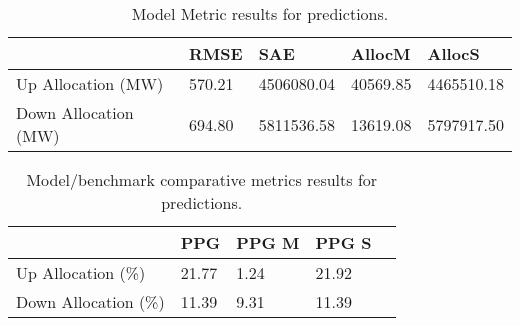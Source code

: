 \begin{table}[H] 
    \caption{Model Metric results for predictions. \label{pred_res_linear}}
    \begin{tabularx}{\textwidth}{CCCCC}
    \toprule
    & \textbf{RMSE}	& \textbf{SAE}	& \textbf{AllocM} & \textbf{AllocS}\\
    \midrule
    Up Allocation (MW) & 570.21 & 4506080.04 & 40569.85 & 4465510.18 \\
    Down Allocation (MW) & 694.80 & 5811536.58 & 13619.08 & 5797917.50 \\
        \bottomrule
    \end{tabularx}
\end{table}


\begin{table}[H] 
    \caption{Model/benchmark comparative metrics results for predictions. \label{pred_res}}
    \begin{tabularx}{\textwidth}{CCCCC}
    \toprule
    & \textbf{PPG}	& \textbf{PPG M}	& \textbf{PPG S} \\
    \midrule
    Up Allocation (\%) & 21.77 & 1.24 & 21.92 \\
    Down Allocation (\%) & 11.39 & 9.31 & 11.39 \\
        \bottomrule
    \end{tabularx}
\end{table}

